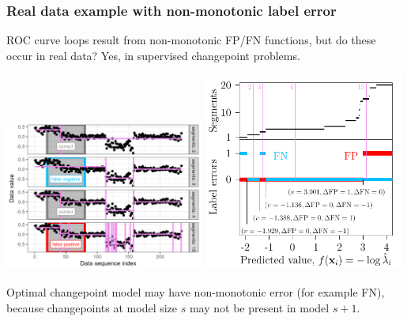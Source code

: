\documentclass{beamer}
\begin{document}
\begin{frame}
  \frametitle{Real data example with non-monotonic label error}

  ROC curve loops result from non-monotonic FP/FN functions, but do
  these occur in real data? Yes, in supervised changepoint
  problems.
  
  \includegraphics[width=0.49\textwidth]{figure-fn-not-monotonic}
  \includegraphics[width=0.49\textwidth]{figure-fn-not-monotonic-error-standAlone}

  Optimal changepoint model may have non-monotonic error (for example
  FN), because changepoints at model size $s$ may not be present in
  model $s+1$.

\end{frame}
\end{document}
